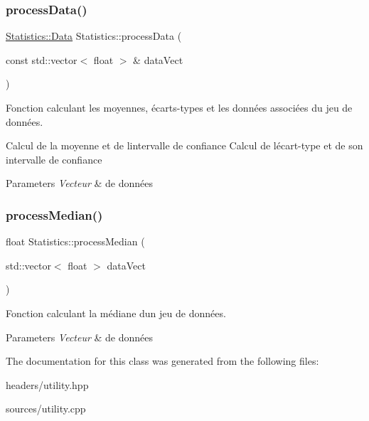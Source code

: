 \subsubsection{\texorpdfstring{process\+Data()}{processData()}}
{\footnotesize\ttfamily \hyperlink{structStatistics_1_1Data}{Statistics\+::\+Data} Statistics\+::process\+Data (\begin{DoxyParamCaption}\item[{const std\+::vector$<$ float $>$ \&}]{data\+Vect }\end{DoxyParamCaption})\hspace{0.3cm}{\ttfamily [static]}}



Fonction calculant les moyennes, écarts-\/types et les données associées du jeu de données. 

Calcul de la moyenne et de l\textquotesingle{}intervalle de confiance Calcul de l\textquotesingle{}écart-\/type et de son intervalle de confiance 
\begin{DoxyParams}{Parameters}
{\em Vecteur} & de données \\
\hline
\end{DoxyParams}
\mbox{\label{classStatistics_ae1c12077162711aa0ea8b4ee6e15b4da}} 
\subsubsection{\texorpdfstring{process\+Median()}{processMedian()}}
{\footnotesize\ttfamily float Statistics\+::process\+Median (\begin{DoxyParamCaption}\item[{std\+::vector$<$ float $>$}]{data\+Vect }\end{DoxyParamCaption})\hspace{0.3cm}{\ttfamily [static]}}



Fonction calculant la médiane d\textquotesingle{}un jeu de données. 


\begin{DoxyParams}{Parameters}
{\em Vecteur} & de données \\
\hline
\end{DoxyParams}


The documentation for this class was generated from the following files\+:\begin{DoxyCompactItemize}
\item 
headers/utility.\+hpp\item 
sources/utility.\+cpp\end{DoxyCompactItemize}
